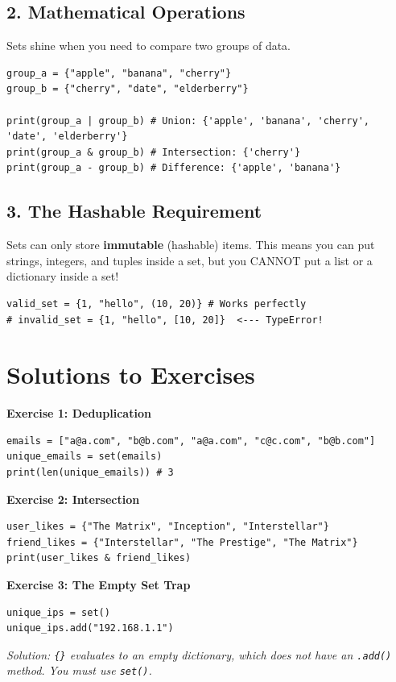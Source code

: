 \subsection{2. Mathematical Operations}
Sets shine when you need to compare two groups of data.
\begin{lstlisting}
group_a = {"apple", "banana", "cherry"}
group_b = {"cherry", "date", "elderberry"}

print(group_a | group_b) # Union: {'apple', 'banana', 'cherry', 'date', 'elderberry'}
print(group_a & group_b) # Intersection: {'cherry'}
print(group_a - group_b) # Difference: {'apple', 'banana'}
\end{lstlisting}

\subsection{3. The Hashable Requirement}
Sets can only store \textbf{immutable} (hashable) items. This means you can put strings, integers, and tuples inside a set, but you CANNOT put a list or a dictionary inside a set!
\begin{lstlisting}
valid_set = {1, "hello", (10, 20)} # Works perfectly
# invalid_set = {1, "hello", [10, 20]}  <--- TypeError!
\end{lstlisting}


\section{Solutions to Exercises}

\textbf{Exercise 1: Deduplication}
\begin{lstlisting}
emails = ["a@a.com", "b@b.com", "a@a.com", "c@c.com", "b@b.com"]
unique_emails = set(emails)
print(len(unique_emails)) # 3
\end{lstlisting}

\vspace{1em}
\textbf{Exercise 2: Intersection}
\begin{lstlisting}
user_likes = {"The Matrix", "Inception", "Interstellar"}
friend_likes = {"Interstellar", "The Prestige", "The Matrix"}
print(user_likes & friend_likes)
\end{lstlisting}

\vspace{1em}
\textbf{Exercise 3: The Empty Set Trap}
\begin{lstlisting}
unique_ips = set()
unique_ips.add("192.168.1.1")
\end{lstlisting}
\textit{Solution: \texttt{\{\}} evaluates to an empty dictionary, which does not have an \texttt{.add()} method. You must use \texttt{set()}.}

